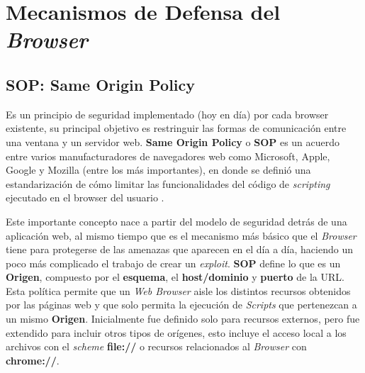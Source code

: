 




\section{Mecanismos de Defensa del \textit{Browser}}

\subsection{SOP: Same Origin Policy} %
\label{chap2:SOP}

    Es un principio de seguridad implementado (hoy en día) por cada browser existente, su principal objetivo es restringuir las formas de comunicación entre una ventana y un servidor web. \textbf{Same Origin Policy} o \textbf{SOP} es un acuerdo entre varios manufacturadores de navegadores web como Microsoft, Apple, Google y Mozilla (entre los más importantes), en donde se definió una estandarización de cómo limitar las funcionalidades del código de \textit{scripting} ejecutado en el browser del usuario \cite{SOPIEFT}. 

    Este importante concepto nace a partir del modelo de seguridad detrás de una aplicación web, al mismo tiempo que es el mecanismo más básico que el \textit{Browser} tiene para protegerse de las amenazas que aparecen en el día a día, haciendo un poco más complicado el trabajo de crear un \textit{exploit}. \textbf{SOP} define lo que es un \textbf{Origen}, compuesto por el \textbf{esquema}, el \textbf{host/dominio} y \textbf{puerto} de la URL. Esta política permite que un \textit{Web Browser} aisle los distintos recursos obtenidos por las páginas web y que solo permita la ejecución de \textit{Scripts} que pertenezcan a un mismo \textbf{Origen}. Inicialmente fue definido solo para recursos externos, pero fue extendido para incluir otros tipos de orígenes, esto incluye el acceso local a los archivos con el \textit{scheme} \textbf{file://} o recursos relacionados al \textit{Browser} con \textbf{chrome://}.

